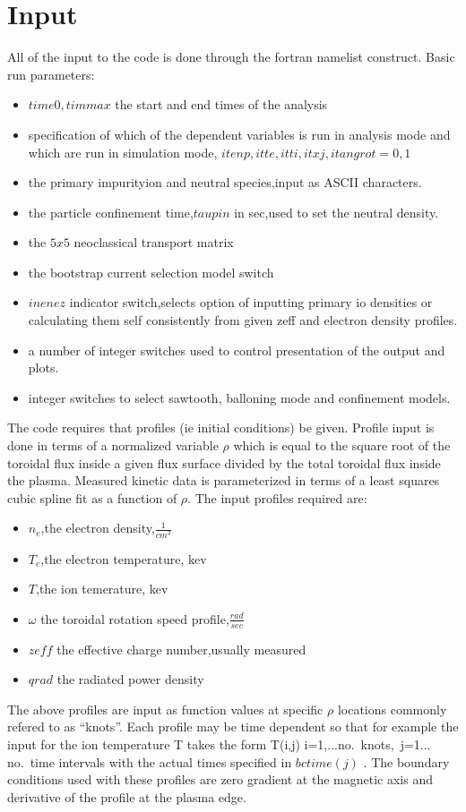\documentclass[12pt]{article}
\begin{document}
\section{Input}
  All of the input to the \ot code is done through the fortran
  namelist construct.
  Basic run parameters:
  \begin{itemize}
  \item $time0,timmax$ the start and end times of the analysis
  \item specification of which of the dependent variables is
         run in analysis mode and which are run in simulation mode,
         $itenp,itte,itti,itxj,itangrot =0,1$
  \item the primary impurityion  and neutral species,input as 
        ASCII characters.
  \item the particle confinement time,$taupin $ in sec,used to set
	the neutral density.
  \item the $5 x 5 $ neoclassical transport matrix
 \item the bootstrap current selection model switch
 \item $inenez $ indicator switch,selects option of inputting primary
	io densities or calculating them self consistently from given
	zeff and electron density profiles. 
  \item a number of integer switches used to control presentation
        of the output and plots.
  \item integer switches to select sawtooth, balloning mode and
	confinement  models.
  \end{itemize}
  The code requires that profiles (ie initial conditions) be given.
  Profile input  is done in terms of a normalized variable
 $ \rho $ which is equal to the square root of the toroidal flux
 inside a given flux surface divided by the total toroidal flux inside the
 plasma.  Measured kinetic data is
 parameterized in terms of a least squares cubic spline fit as a function
 of $\rho $.  The input profiles required are:
 \begin{itemize}
  \item $n_e$,the electron density,$\frac{1}{cm^3}$
  \item $T_e$,the electron temperature, kev
  \item $T$,the ion temerature, kev
  \item $\omega $ the toroidal rotation speed profile,$\frac{rad}{sec}$
  \item $zeff $  the effective charge number,usually measured
   \item $qrad$ the radiated power density 
 \end{itemize}
 The above profiles are input as function values at specific $\rho$ locations
 commonly refered to as ``knots''. Each profile may be time dependent so
 that for example the input for the ion temperature T takes the form
 \beq
          T(i,j) i=1,...no.\  knots,\ j=1... no.\  time intervals
 \eeq
	with the actual times specified in  $bctime(j) $ .
 The boundary conditions used with these profiles are zero gradient
 at the magnetic axis and derivative of the profile at the plasma edge.
\end{document}
